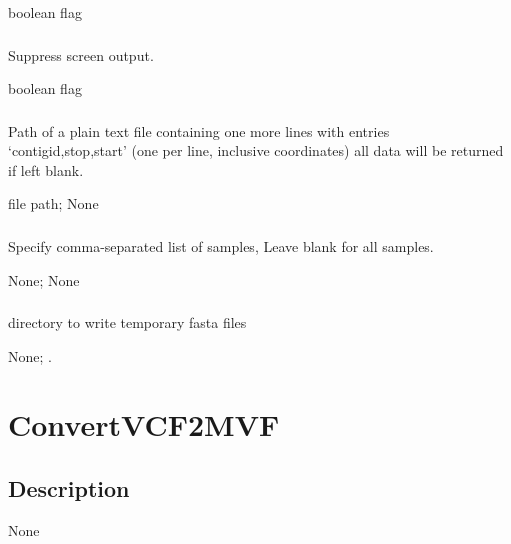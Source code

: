 \documentclass[letterpaper,11pt,english]{sphinxmanual}
\begin{document}
 boolean flag


\subsubsection{}
\label{\detokenize{prog_desc:id27}}
 Suppress screen output.

 boolean flag


\subsubsection{}
\label{\detokenize{prog_desc:id28}}
 Path of a plain text file containing one more lines with entries ‘contigid,stop,start’ (one per line, inclusive coordinates) all data will be returned if left blank.

 file path;  None


\subsubsection{}
\label{\detokenize{prog_desc:id29}}
 Specify comma-separated list of samples, Leave blank for all samples.

 None;  None


\subsubsection{}
\label{\detokenize{prog_desc:id30}}
 directory to write temporary fasta files

 None;  .


\section{ConvertVCF2MVF}
\label{\detokenize{prog_desc:convertvcf2mvf}}

\subsection{Description}
\label{\detokenize{prog_desc:id31}}
None
\end{document}
